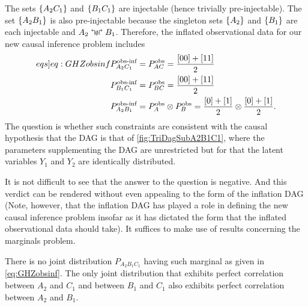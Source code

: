 The sets $\left\lbrace A_2 C_1\right\rbrace$ and $\left\lbrace B_1 C_1\right\rbrace$ are injectable (hence trivially pre-injectable). The set $\left\lbrace A_2 B_1\right\rbrace$ is also pre-injectable because the singleton sets $\left\lbrace A_2\right\rbrace$ and $\left\lbrace B_1\right\rbrace$ are each injectable and $A_2 \mathrel{\mathopen{\Lsh}{\scriptstyle\emptyset}\mathclose{\Rsh}} B_1$.
Therefore, the inflated observational data for our new causal inference problem includes
\begin{align}\begin{split}\label[eqs]{eq:GHZobsinf}
&P^{\text{obs-inf}}_{A_2 C_1} =P^{\text{obs}}_{A C}= \frac{[00]+[11]}{2}\\
&P^{\text{obs-inf}}_{B_1 C_1} =P^{\text{obs}}_{B C}= \frac{[00]+[11]}{2}\\
&P^{\text{obs-inf}}_{A_2 B_1} =P^{\text{obs}}_A \otimes P^{\text{obs}}_B= \frac{[0]+[1]}{2}\otimes\frac{[0]+[1]}{2}. 
\end{split}\end{align}
The question is whether such constraints are consistent with the causal hypothesis that the DAG is that of \cref{fig:TriDagSubA2B1C1}, where the parameters supplementing the DAG are unrestricted but for that the latent variables $Y_1$ and $Y_2$ are identically distributed. 

It is not difficult to see that the answer to the question is negative.  And this verdict can be rendered without even appealing to the form of the inflation DAG (Note, however, that the inflation DAG has played a role in defining the new causal inference problem insofar as it has dictated the form that the inflated observational data should take).  It suffices to make use of results concerning the marginals problem.  

There is no joint distribution $P_{A_2 B_1 C_1}$ having such marginal as given in \cref{eq:GHZobsinf}. The only joint distribution that exhibits perfect correlation between $A_2$ and $C_1$ and between $B_1$ and $C_1$ also exhibits perfect correlation between $A_2$ and $B_1$.  

